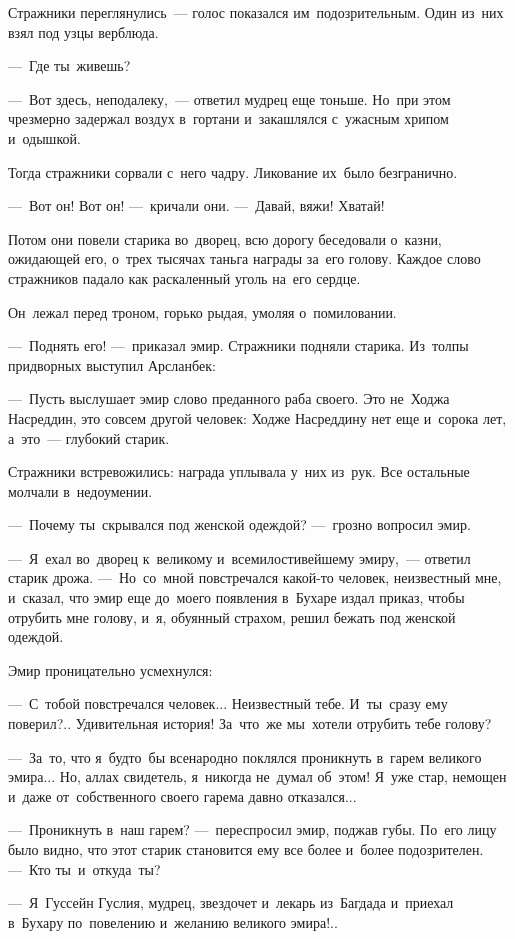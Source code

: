 \documentclass[12pt,a4paper]{book}
\begin{document}
Стражники переглянулись~— голос показался им~подозрительным. Один из~них взял под узцы верблюда.

—~Где ты~живешь?

—~Вот здесь, неподалеку,~— ответил мудрец еще тоньше. Но~при этом чрезмерно задержал воздух в~гортани и~закашлялся с~ужасным хрипом и~одышкой.

Тогда стражники сорвали с~него чадру. Ликование их~было безгранично.

—~Вот он! Вот он! —~кричали они. —~Давай, вяжи! Хватай!

Потом они повели старика во~дворец, всю дорогу беседовали о~казни, ожидающей его, о~трех тысячах таньга награды за~его голову. Каждое слово стражников падало как раскаленный уголь на~его сердце.

Он~лежал перед троном, горько рыдая, умоляя о~помиловании.

—~Поднять его! —~приказал эмир. Стражники подняли старика. Из~толпы придворных выступил Арсланбек:

—~Пусть выслушает эмир слово преданного раба своего. Это не~Ходжа Насреддин, это совсем другой человек: Ходже Насреддину нет еще и~сорока лет, а~это~— глубокий старик.

Стражники встревожились: награда уплывала у~них из~рук. Все остальные молчали в~недоумении.

—~Почему ты~скрывался под женской одеждой? —~грозно вопросил эмир.

—~Я~ехал во~дворец к~великому и~всемилостивейшему эмиру,~— ответил старик дрожа. —~Но~со~мной повстречался какой-то человек, неизвестный мне, и~сказал, что эмир еще до~моего появления в~Бухаре издал приказ, чтобы отрубить мне голову, и~я, обуянный страхом, решил бежать под женской одеждой.

Эмир проницательно усмехнулся:

—~С~тобой повстречался человек... Неизвестный тебе. И~ты~сразу ему поверил?.. Удивительная история! За~что~же мы~хотели отрубить тебе голову?

—~За~то, что я~будто~бы всенародно поклялся проникнуть в~гарем великого эмира... Но, аллах свидетель, я~никогда не~думал об~этом! Я~уже стар, немощен и~даже от~собственного своего гарема давно отказался...

—~Проникнуть в~наш гарем? —~переспросил эмир, поджав губы. По~его лицу было видно, что этот старик становится ему все более и~более подозрителен. —~Кто ты~и~откуда~ты?

—~Я~Гуссейн Гуслия, мудрец, звездочет и~лекарь из~Багдада и~приехал в~Бухару по~повелению и~желанию великого эмира!..
\end{document}
